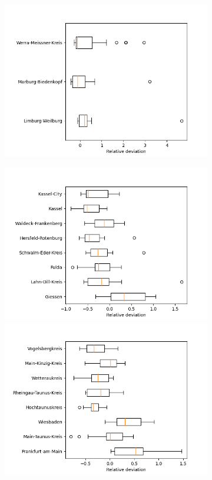 \begin{figure}
\begin{subfigure}[b]{0.32\textwidth}
		\includegraphics[width=\textwidth]{./figures/76d/deviation_box76_4.png}	
	\end{subfigure}
	\begin{subfigure}[b]{0.32\textwidth}
		\centering
		\caption*{}
		\includegraphics[width=\textwidth]{./figures/60d/deviation_box60_1.png}	
		\includegraphics[width=\textwidth]{./figures/60d/deviation_box60_2.png}	

\end{subfigure}
\end{figure}
